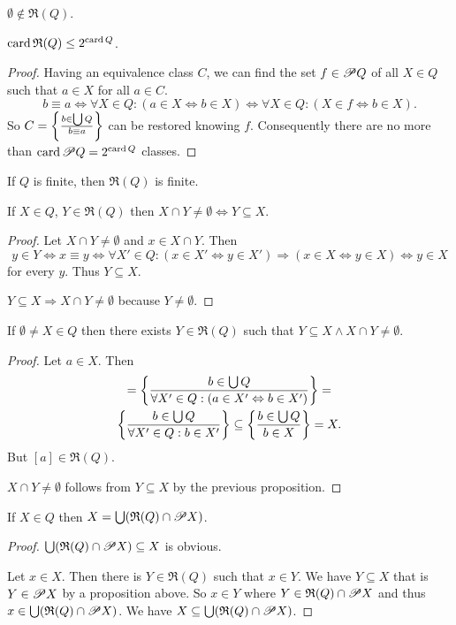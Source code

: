 \begin{obvious}
$\emptyset\notin\mathfrak{R}(Q)$.\end{obvious}
\begin{lem}
$\operatorname{card}\mathfrak{R}(Q)\leq2^{\operatorname{card} Q}$.\end{lem}
\begin{proof}
Having an equivalence class $C$, we can find the set $f\in\mathscr{P} Q$
of all $X\in Q$ such that $a\in X$ for all $a\in C$. 
\[
b\equiv a\Leftrightarrow\forall X\in Q:(a\in X\Leftrightarrow b\in X)\Leftrightarrow\forall X\in Q:(X\in f\Leftrightarrow b\in X).
\]
So $C=\left\{ \frac{b\in\bigcup Q}{b\equiv a}\right\}$ can be restored knowing
$f$. Consequently there are no more than $\operatorname{card}\mathscr{P} Q=2^{\operatorname{card} Q}$
classes.\end{proof}
\begin{cor}
If $Q$ is finite, then $\mathfrak{R}(Q)$ is finite.\end{cor}
\begin{prop}
If $X\in Q$, $Y\in\mathfrak{R}(Q)$ then $X\cap Y\neq\emptyset\Leftrightarrow Y\subseteq X$.\end{prop}
\begin{proof}
Let $X\cap Y\neq\emptyset$ and $x\in X\cap Y$. Then 
\[
y\in Y\Leftrightarrow x\equiv y\Leftrightarrow\forall X'\in Q:(x\in X'\Leftrightarrow y\in X')\Rightarrow(x\in X\Leftrightarrow y\in X)\Leftrightarrow y\in X
\]
 for every $y$. Thus $Y\subseteq X$.

$Y\subseteq X\Rightarrow X\cap Y\neq\emptyset$ because $Y\neq\emptyset$.\end{proof}
\begin{prop}
If $\emptyset\neq X\in Q$ then there exists $Y\in\mathfrak{R}(Q)$
such that $Y\subseteq X\wedge X\cap Y\neq\emptyset$.\end{prop}
\begin{proof}
Let $a\in X$. Then 
\begin{multline*}
[a]=\setcond{b\in\bigcup Q}{\forall X'\in Q:(a\in X'\Leftrightarrow b\in X')}=\\
\setcond{b\in\bigcup Q}{\forall X'\in Q:b\in X'}\subseteq\setcond{b\in\bigcup Q}{b\in X}=X.
\end{multline*}
But $[a]\in\mathfrak{R}(Q)$.

$X\cap Y\neq\emptyset$ follows from $Y\subseteq X$ by the previous
proposition.\end{proof}
\begin{prop}
If $X\in Q$ then $X=\bigcup(\mathfrak{R}(Q)\cap\mathscr{P} X)$.\end{prop}
\begin{proof}
$\bigcup(\mathfrak{R}(Q)\cap\mathscr{P} X)\subseteq X$ is obvious.

Let $x\in X$. Then there is $Y\in\mathfrak{R}(Q)$ such that $x\in Y$.
We have $Y\subseteq X$ that is $Y\in\mathscr{P} X$ by a proposition
above. So $x\in Y$ where $Y\in\mathfrak{R}(Q)\cap\mathscr{P} X$ and
thus $x\in\bigcup(\mathfrak{R}(Q)\cap\mathscr{P} X)$. We have $X\subseteq\bigcup(\mathfrak{R}(Q)\cap\mathscr{P} X)$.
\end{proof}

